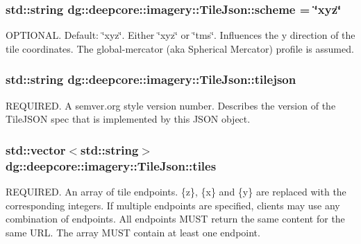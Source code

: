\subsubsection[{\texorpdfstring{scheme}{scheme}}]{\setlength{\rightskip}{0pt plus 5cm}std\+::string dg\+::deepcore\+::imagery\+::\+Tile\+Json\+::scheme = \char`\"{}xyz\char`\"{}}\hypertarget{structdg_1_1deepcore_1_1imagery_1_1_tile_json_aa81ddd251615c83ed800924570aa6530}{}\label{structdg_1_1deepcore_1_1imagery_1_1_tile_json_aa81ddd251615c83ed800924570aa6530}
O\+P\+T\+I\+O\+N\+AL. Default\+: \char`\"{}xyz\char`\"{}. Either \char`\"{}xyz\char`\"{} or \char`\"{}tms\char`\"{}. Influences the y direction of the tile coordinates. The global-\/mercator (aka Spherical Mercator) profile is assumed. 
\subsubsection[{\texorpdfstring{tilejson}{tilejson}}]{\setlength{\rightskip}{0pt plus 5cm}std\+::string dg\+::deepcore\+::imagery\+::\+Tile\+Json\+::tilejson}\hypertarget{structdg_1_1deepcore_1_1imagery_1_1_tile_json_a6eaf5b206fdf010f6c4b089d9f1dbe32}{}\label{structdg_1_1deepcore_1_1imagery_1_1_tile_json_a6eaf5b206fdf010f6c4b089d9f1dbe32}
R\+E\+Q\+U\+I\+R\+ED. A semver.\+org style version number. Describes the version of the Tile\+J\+S\+ON spec that is implemented by this J\+S\+ON object. 
\subsubsection[{\texorpdfstring{tiles}{tiles}}]{\setlength{\rightskip}{0pt plus 5cm}std\+::vector$<$std\+::string$>$ dg\+::deepcore\+::imagery\+::\+Tile\+Json\+::tiles}\hypertarget{structdg_1_1deepcore_1_1imagery_1_1_tile_json_a586d9458169760019abd61b1651c5112}{}\label{structdg_1_1deepcore_1_1imagery_1_1_tile_json_a586d9458169760019abd61b1651c5112}
R\+E\+Q\+U\+I\+R\+ED. An array of tile endpoints. \{z\}, \{x\} and \{y\} are replaced with the corresponding integers. If multiple endpoints are specified, clients may use any combination of endpoints. All endpoints M\+U\+ST return the same content for the same U\+RL. The array M\+U\+ST contain at least one endpoint. 

